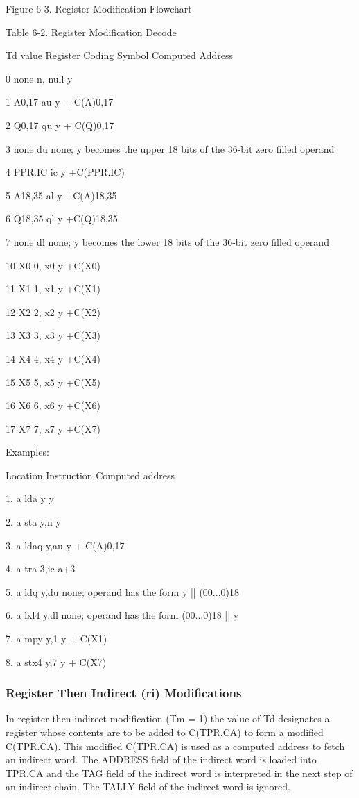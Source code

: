 Figure 6-3. Register Modification Flowchart

Table 6-2. Register Modification Decode


Td value Register Coding Symbol Computed Address

0 none n, null y

1 A0,17 au y + C(A)0,17

2 Q0,17 qu y + C(Q)0,17 

3 none du none; y becomes the upper 18 bits of the 36-bit zero filled operand

4 PPR.IC ic y +C(PPR.IC) 

5 A18,35 al y +C(A)18,35 

6 Q18,35 ql y +C(Q)18,35

7 none dl none; y becomes the lower 18 bits of the 36-bit zero filled operand

10 X0 0, x0 y +C(X0)

11 X1 1, x1 y +C(X1)

12 X2 2, x2 y +C(X2) 

13 X3 3, x3 y +C(X3)

14 X4 4, x4 y +C(X4) 

15 X5 5, x5 y +C(X5) 

16 X6 6, x6 y +C(X6)

17 X7 7, x7 y +C(X7) 

Examples:

Location Instruction Computed address

1.  a lda y y

2.  a sta y,n y 

3.  a ldaq y,au y + C(A)0,17 

4.  a tra 3,ic a+3 

5.  a ldq y,du none; operand has the form y || (00...0)18 

6.  a lxl4 y,dl none; operand has the form (00...0)18 || y 

7.  a mpy y,1 y + C(X1) 

8.  a stx4 y,7 y + C(X7)

\subsubsection{Register Then Indirect (ri) Modifications}

In register then indirect modification (Tm = 1) the value of Td designates a
register whose contents are to be added to C(TPR.CA) to form a modified
C(TPR.CA). This modified C(TPR.CA) is used as a computed address to fetch an
indirect word. The ADDRESS field of the indirect word is loaded into TPR.CA and
the TAG field of the indirect word is interpreted in the next step of an
indirect chain. The TALLY field of the indirect word is ignored.

